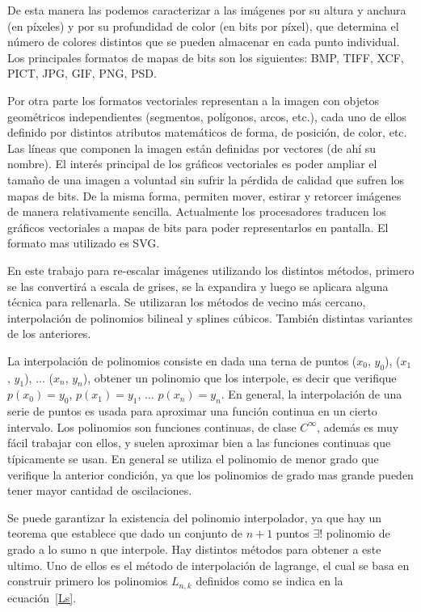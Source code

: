 \documentclass[a4paper]{article}
\newcounter{col}
\begin{document}
De esta manera las podemos caracterizar a las imágenes por su altura y anchura (en píxeles) y por su profundidad de color (en bits por píxel), que determina el número de colores distintos que se pueden almacenar en cada punto individual. Los principales formatos de mapas de bits son los siguientes: BMP, TIFF, XCF, PICT, JPG, GIF, PNG, PSD.

Por otra parte los formatos vectoriales representan a la imagen con objetos geométricos independientes (segmentos, polígonos, arcos, etc.), cada uno de ellos definido por distintos atributos matemáticos de forma, de posición, de color, etc. Las líneas que componen la imagen están definidas por vectores (de ahí su nombre). El interés principal de los gráficos vectoriales es poder ampliar el tamaño de una imagen a voluntad sin sufrir la pérdida de calidad que sufren los mapas de bits. De la misma forma, permiten mover, estirar y retorcer imágenes de manera relativamente sencilla. Actualmente los procesadores traducen los gráficos vectoriales a mapas de bits para poder representarlos en pantalla. El formato mas utilizado es SVG.

En este trabajo para re-escalar imágenes utilizando los distintos métodos, primero se las convertirá a escala de grises, se la expandira y luego se aplicara alguna técnica para rellenarla. Se utilizaran los métodos de vecino más cercano, interpolación de polinomios bilineal y splines cúbicos. También distintas variantes de los anteriores.

La interpolación de polinomios consiste en dada una terna de puntos ($ x_{0} $, $ y_{0} $), ($ x_{1} $, $ y_{1} $), $ \ldots $ ($ x_{n} $, $ y_{n} $), obtener un polinomio que los interpole, es decir que verifique $ p(x_{0}) =  y_{0} $, $ p(x_{1}) =  y_{1} $, $ \ldots $ $ p(x_{n}) =  y_{n} $. En general, la interpolación de una serie de puntos es usada para aproximar una función continua en un cierto intervalo. Los polinomios son funciones continuas, de clase $ C^{\infty} $, además es muy fácil trabajar con ellos, y suelen aproximar bien a las funciones continuas que típicamente se usan. En general se utiliza el polinomio de menor grado que verifique la anterior condición, ya que los polinomios de grado mas grande pueden tener mayor cantidad de oscilaciones.

Se puede garantizar la existencia del polinomio interpolador, ya que hay un teorema que establece que dado un conjunto de $ n +1 $ puntos $ \exists! $ polinomio de grado a lo sumo n que interpole. Hay distintos métodos para obtener a este ultimo. Uno de ellos es el método de interpolación de lagrange, el cual se basa en construir primero los polinomios $ L_{n,k} $ definidos como se indica en la ecuación~\ref{Ls}. \cite{burden}
\end{document}
